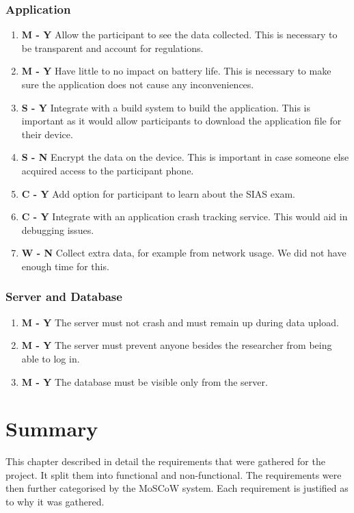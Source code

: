 \documentclass{l4proj}
\begin{document}
\subsubsection{Application}
\begin{enumerate}[resume,label={\textbf{\arabic* -}}]
    \item \textbf{M - Y} Allow the participant to see the data collected. This is necessary to be transparent and account for regulations.
    \item \textbf{M - Y} Have little to no impact on battery life. This is necessary to make sure the application does not cause any inconveniences.
    \item \textbf{S - Y} Integrate with a build system to build the application. This is important as it would allow participants to download the application file for their device.
    \item \textbf{S - N} Encrypt the data on the device. This is important in case someone else acquired access to the participant phone.
    \item \textbf{C - Y} Add option for participant to learn about the SIAS exam.
    \item \textbf{C - Y} Integrate with an application crash tracking service. This would aid in debugging issues.
    \item \textbf{W - N} Collect extra data, for example from network usage. We did not have enough time for this.
\end{enumerate}

\subsubsection{Server and Database}
\begin{enumerate}[resume,label={\textbf{\arabic* -}}]
    \item \textbf{M - Y} The server must not crash and must remain up during data upload.
    \item \textbf{M - Y} The server must prevent anyone besides the researcher from being able to log in.
    \item \textbf{M - Y} The database must be visible only from the server.
\end{enumerate}

\section{Summary}
This chapter described in detail the requirements that were gathered for the project. It split them into functional and non-functional. The requirements were then further categorised by the MoSCoW system. Each requirement is justified as to why it was gathered.
\end{document}
